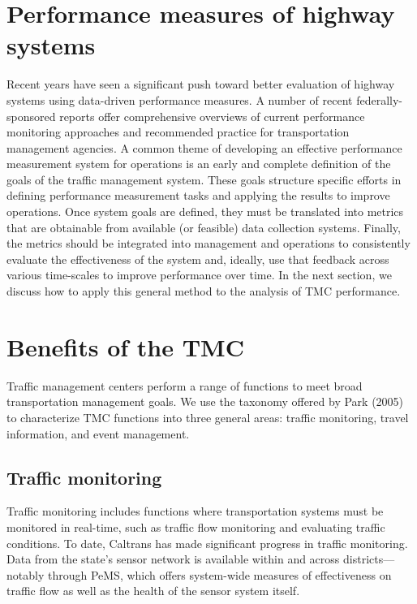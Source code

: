 \documentclass[12pt]{report}
\begin{document}
\section{Performance measures of highway systems}
\label{sec:perf-hw-sys}

Recent years have seen a significant push toward better evaluation of
highway systems using data-driven performance measures. A number of
recent federally-sponsored reports offer comprehensive overviews of
current performance monitoring approaches and recommended practice for
transportation management agencies. A common theme of developing an
effective performance measurement system for operations is an early
and complete definition of the goals of the traffic management
system. These goals structure specific efforts in defining performance
measurement tasks and applying the results to improve operations. Once
system goals are defined, they must be translated into metrics that
are obtainable from available (or feasible) data collection systems.
Finally, the metrics should be integrated into management and
operations to consistently evaluate the effectiveness of the system
and, ideally, use that feedback across various time-scales to improve
performance over time. In the next section, we discuss how to apply
this general method to the analysis of TMC performance.

\section{Benefits of the TMC}
\label{sec:tmc-bene}

Traffic management centers perform a range of functions to meet broad
transportation management goals. We use the taxonomy offered by Park (2005) to
characterize TMC functions into three general areas: traffic monitoring, travel
information, and event management.

\subsection{Traffic monitoring}
\label{sec:traf-mon}

Traffic monitoring includes functions where transportation systems must be
monitored in real-time, such as traffic flow monitoring and evaluating traffic
conditions. To date, Caltrans has made significant progress in traffic
monitoring. Data from the state's sensor network is available within and across
districts---notably through PeMS, which offers system-wide measures of
effectiveness on traffic flow as well as the health of the sensor system itself.
\end{document}
